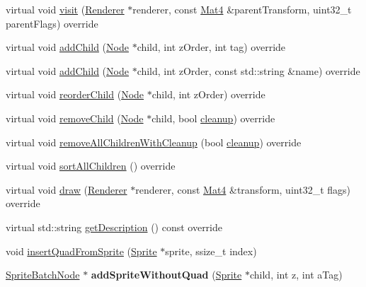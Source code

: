 \begin{DoxyCompactItemize}
\item 
virtual void \hyperlink{classSpriteBatchNode_a2cccb328ace35dc3e02d7ca8824df65d}{visit} (\hyperlink{classRenderer}{Renderer} $\ast$renderer, const \hyperlink{classMat4}{Mat4} \&parent\+Transform, uint32\+\_\+t parent\+Flags) override
\item 
virtual void \hyperlink{classSpriteBatchNode_a512bd0b1e1bd2741a99bff3997fcbbd6}{add\+Child} (\hyperlink{classNode}{Node} $\ast$child, int z\+Order, int tag) override
\item 
virtual void \hyperlink{classSpriteBatchNode_abd6946884e475168e7e9530e1b1c793a}{add\+Child} (\hyperlink{classNode}{Node} $\ast$child, int z\+Order, const std\+::string \&name) override
\item 
virtual void \hyperlink{classSpriteBatchNode_a8125810f4a9d5e1c4a4c82cd906baafd}{reorder\+Child} (\hyperlink{classNode}{Node} $\ast$child, int z\+Order) override
\item 
virtual void \hyperlink{classSpriteBatchNode_a918786ec36ffac4169444d478e455c5c}{remove\+Child} (\hyperlink{classNode}{Node} $\ast$child, bool \hyperlink{classNode_aa2de84c6cdeec9cd647d236c30ee0567}{cleanup}) override
\item 
virtual void \hyperlink{classSpriteBatchNode_aef759fbb4337b71813e05bf91a0daae8}{remove\+All\+Children\+With\+Cleanup} (bool \hyperlink{classNode_aa2de84c6cdeec9cd647d236c30ee0567}{cleanup}) override
\item 
virtual void \hyperlink{classSpriteBatchNode_a939e68291147526d7d452a310b59b0b7}{sort\+All\+Children} () override
\item 
virtual void \hyperlink{classSpriteBatchNode_ad47c7d508825041270ed552f647f86e3}{draw} (\hyperlink{classRenderer}{Renderer} $\ast$renderer, const \hyperlink{classMat4}{Mat4} \&transform, uint32\+\_\+t flags) override
\item 
virtual std\+::string \hyperlink{classSpriteBatchNode_a6040059cb5e2e7681cbddc0d55a2859e}{get\+Description} () const override
\item 
void \hyperlink{classSpriteBatchNode_ae3aa8d2d53d2e6ba43a03770e8a88a41}{insert\+Quad\+From\+Sprite} (\hyperlink{classSprite}{Sprite} $\ast$sprite, ssize\+\_\+t index)
\item 
\mbox{\label{classSpriteBatchNode_a132fec712b9f57b7e8ada3ff3dc37bc3}} 
\hyperlink{classSpriteBatchNode}{Sprite\+Batch\+Node} $\ast$ {\bfseries add\+Sprite\+Without\+Quad} (\hyperlink{classSprite}{Sprite} $\ast$child, int z, int a\+Tag)

\end{DoxyCompactItemize}
